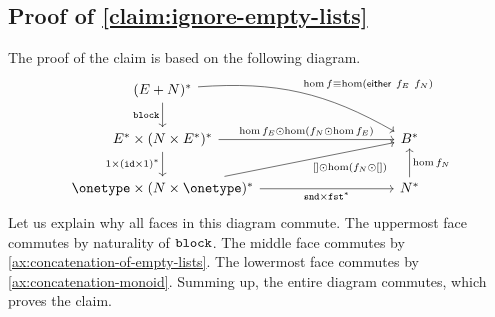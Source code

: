 \subsection{Proof of \cref{claim:ignore-empty-lists}}
\label{sec:proof-of-claim:ignore-empty-lists}
The proof of the claim is based on the following diagram.
            \[
    \begin{tikzcd}
        [column sep=huge]
        (E+N)^* 
        \ar[d,"\blockterm"']
        \ar[drr, bend left = 17, "\hom f \equiv \hom(\either {f_E}  {f_N})"]
        \\
        E^* \times (N \times E^*)^* 
        \ar[rr, "{\hom f_E \fdot \hom ( f_N \fdot \hom f_E)}"] 
        \ar[d,"1 \times (\idterm \times 1)^*"']
        & & 
         B^*
                  \\
         \onetype \times (N \times \onetype)^*
                 \ar[urr, "{[] \fdot \hom ( f_N \fdot [])}"'] 
        \ar[rr,"\sndterm \times \fstterm^*"']
         &  & 
         N^*
         \ar[u,"{\hom f_N}"']
    \end{tikzcd}
    \]
    Let us explain why all faces in this diagram commute. The uppermost face commutes by naturality of $\mathtt{block}$.  The middle face commutes by \cref{ax:concatenation-of-empty-lists}. The lowermost face commutes by \cref{ax:concatenation-monoid}.  Summing up, the entire diagram commutes, which proves the claim.


